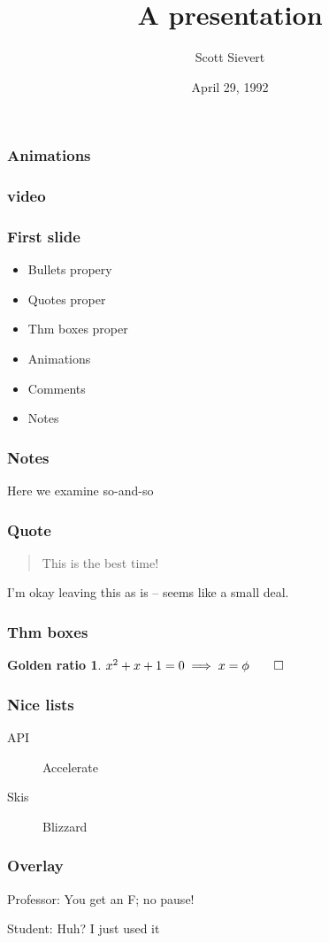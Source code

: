 \documentclass{beamer}
\title[An alternate title]{A presentation}
\author{Scott Sievert}
\institute{University of Wisconsin-Madison}
\date{April 29, 1992}
\newtheorem{mydef}{Golden ratio}
\begin{document}
\maketitle

\begin{frame}
    \frametitle{Animations}
\end{frame}

\begin{frame}
    \frametitle{video}
\end{frame}

\begin{frame}
    \frametitle{First slide}
    \begin{itemize}
        \item Bullets propery
        \item Quotes proper
        \item Thm boxes proper
        \item Animations
        \item Comments
        \item Notes
    \end{itemize}
\end{frame}

\begin{frame}
    \frametitle{Notes}
    Here we examine so-and-so
\end{frame}

\begin{frame}
    \frametitle{Quote}
    \begin{quotation}
        This is the best time!
    \end{quotation}
    I'm okay leaving this as is -- seems like a small deal.
\end{frame}

\begin{frame}
    \frametitle{Thm boxes}
    \begin{mydef}
        $x^2 + x + 1 = 0 \implies x = \phi \qed$
    \end{mydef}
\end{frame}

\begin{frame}
    \frametitle{Nice lists}
    \begin{description}
        \item[API] Accelerate
        \item[Skis] Blizzard
    \end{description}
\end{frame}

\begin{frame}
    \frametitle{Overlay}
    Professor: You get an F; no pause!

    \pause

    Student: Huh? I just used it
\end{frame}
\end{document}

